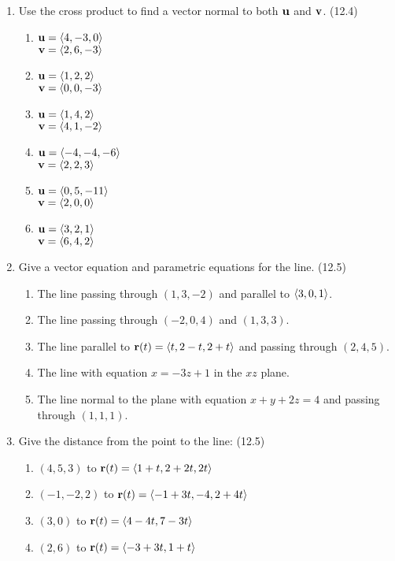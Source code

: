 \begin{enumerate}
    \newpage

    \item Use the cross product to find a vector normal to both $\mathbf{u}$ and $\mathbf{v}$. (12.4)

      \begin{enumerate}
        \item $\mathbf{u}=\left<4,-3,0\right>$\\ $\mathbf{v}=\left<2,6,-3\right>$
        \item $\mathbf{u}=\left<1,2,2\right>$\\ $\mathbf{v}=\left<0,0,-3\right>$
        \item $\mathbf{u}=\left<1,4,2\right>$\\ $\mathbf{v}=\left<4,1,-2\right>$
        \item $\mathbf{u}=\left<-4,-4,-6\right>$\\ $\mathbf{v}=\left<2,2,3\right>$
        \item $\mathbf{u}=\left<0,5,-11\right>$\\ $\mathbf{v}=\left<2,0,0\right>$
        \item $\mathbf{u}=\left<3,2,1\right>$\\ $\mathbf{v}=\left<6,4,2\right>$
      \end{enumerate}

    \item Give a vector equation and parametric equations for the line. (12.5)

      \begin{enumerate}
        \item The line passing through $(1,3,-2)$ and parallel to $\left<3,0,1\right>$.
        \item The line passing through $(-2,0,4)$ and $(1,3,3)$.
        \item The line parallel to $\mathbf{r}(t)=\left<t,2-t,2+t\right>$ and passing through $(2,4,5)$.
        \item The line with equation $x=-3z+1$ in the $xz$ plane.
        \item The line normal to the plane with equation $x+y+2z=4$ and passing through $(1,1,1)$.
      \end{enumerate}

    \item Give the distance from the point to the line: (12.5) %

      \begin{enumerate}
        \item $(4,5,3)$ to $\mathbf{r}(t) = \left<1+t,2+2t,2t\right>$
        \item $(-1,-2,2)$ to $\mathbf{r}(t) = \left<-1+3t,-4,2+4t\right>$
        \item $(3,0)$ to $\mathbf{r}(t) = \left<4-4t,7-3t\right>$
        \item $(2,6)$ to $\mathbf{r}(t) = \left<-3+3t,1+t\right>$
      \end{enumerate}


\end{enumerate}

